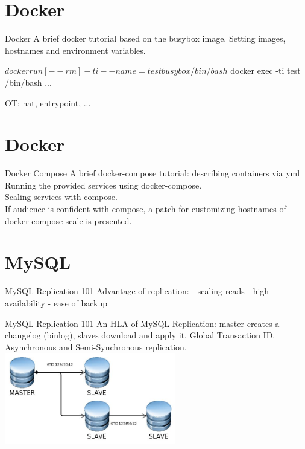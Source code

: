 \documentclass{beamer}[10]
\begin{document}
%
%
\section{Docker}
\begin{pyframe}{Docker}
A brief docker tutorial based
on the busybox image.
Setting images, hostnames and environment variables.
\begin{bashcode}
$ docker run [--rm] -ti --name=test busybox /bin/bash
$ docker exec -ti  test /bin/bash
...
\end{bashcode}
OT: nat, entrypoint, ...
\end{pyframe}

\section{Docker}
\begin{pyframe}{Docker Compose}
A brief docker-compose tutorial:
describing containers via yml
\\
Running the provided services
using docker-compose.
\\
Scaling services with compose.
\\
If audience is confident with compose, a patch
for customizing hostnames of docker-compose scale is presented.

\end{pyframe}

%
%
\section{MySQL}
\begin{pyframe}{MySQL Replication 101}
Advantage of replication:
  - scaling reads
  - high availability
  - ease of backup
\end{pyframe}


\begin{pyframe}{MySQL Replication 101}
An HLA of MySQL Replication:
master creates a changelog (binlog),
slaves download and apply it.
Global Transaction ID.
Asynchronous and Semi-Synchronous replication.
\includegraphics[height=4cm]{images/mysql-propagate-gtid.jpg}
\end{pyframe}
\end{document}
